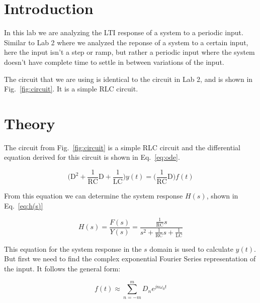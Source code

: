 \documentclass[11pt]{texMemo-gibbons}
\begin{document}
\maketitle

\section{Introduction}
\label{sec:introduction}

In this lab we are analyzing the LTI response of a system
to a periodic input. Similar to Lab 2 where we analyzed
the reponse of a system to a certain input, here the
input isn't a step or ramp, but rather a periodic input
where the system doesn't have complete time to settle
in between variations of the input.

The circuit that we are using is identical to the circuit in 
Lab 2, and is shown in Fig.~\ref{fig:circuit}. It is a simple
RLC circuit.


\section{Theory}
\label{sec:theory}

The circuit from Fig.~\ref{fig:circuit} is a simple
RLC circuit and the differential equation derived for
this circuit is shown in Eq.~\ref{eq:ode}.

\begin{equation}
  \Big(\text{D}^2 + \frac{1}{\text{R}\text{C}}\text{D} + \frac{1}{\text{L}\text{C}}\Big)y(t) = \Big(\frac{1}{\text{R}\text{C}}\text{D}\Big)f(t)
  \label{eq:ode}
\end{equation}

From this equation we can determine the system response $H(s)$,
shown in Eq.~\ref{eq:h(s)}

\begin{equation}
  H(s) = \frac{F(s)}{Y(s)} = \frac{\frac{1}{\text{R}\text{C}} s }{s^2 + \frac{1}{\text{R}\text{C}} s + \frac{1}{\text{L}\text{C}}}
  \label{eq:h(s)}
\end{equation}

This equation for the system response in the $s$ domain
is used to calculate $y(t)$. But first we need to find
the complex exponential Fourier Series representation
of the input. It follows the general form:

\begin{equation}
  f(t) \approx \sum_{n=-m}^{m}D_n e^{jn\omega_0 t}
  \label{eq:f(t)}
\end{equation}
\end{document}
